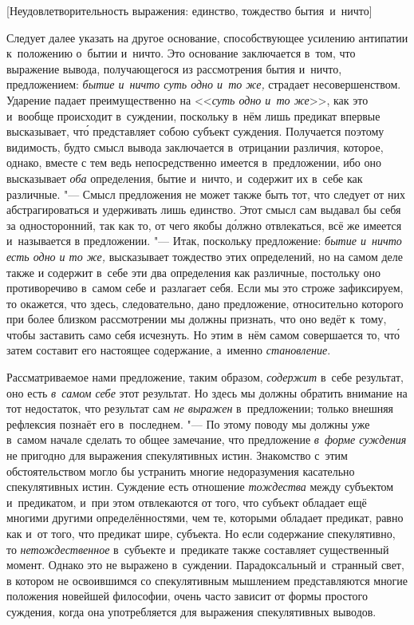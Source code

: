 %
{[Неудовлетворительность выражения: единство, тождество бытия~и~ничто]}

Следует далее указать на другое основание, способствующее усилению антипатии
к~положению о~бытии и~ничто. Это основание заключается в~том, что выражение
вывода, получающегося из рассмотрения бытия и~ничто, предложением:
{\em бытие и~ничто суть одно и~то же,} страдает несовершенством. Ударение
падает преимущественно на <<{\em суть одно и~то же}>>, как это и~вообще
происходит в~суждении, поскольку в~нём лишь предикат впервые высказывает,
чт\'{о} представляет собою субъект суждения. Получается поэтому видимость,
будто смысл вывода заключается в~отрицании различия, которое, однако, вместе с
тем ведь непосредственно имеется в~предложении, ибо оно высказывает {\em оба}
определения, бытие и~ничто, и~содержит их в~себе как различные. "--- Смысл
предложения не может также быть тот, что следует от них абстрагироваться и
удерживать лишь единство. Этот смысл сам выдавал бы себя за односторонний, так
как то, от чего якобы д\'{о}лжно отвлекаться, всё же имеется и~называется в
предложении. "--- Итак, поскольку предложение: {\em бытие и~ничто есть одно и
то же,} высказывает тождество этих определений, но на самом деле также и
содержит в~себе эти два определения как различные, постольку оно противоречиво
в~самом себе и~разлагает себя. Если мы это строже зафиксируем, то окажется, что
здесь, следовательно, дано предложение, относительно которого при более близком
рассмотрении мы должны признать, что оно ведёт к~тому, чтобы заставить само
себя исчезнуть. Но этим в~нём самом совершается то, чт\'{о} затем составит его
настоящее содержание, а~именно {\em становление}.

Рассматриваемое нами предложение, таким образом, {\em содержит} в~себе
результат, оно есть {\em в~самом себе} этот результат. Но здесь мы должны
обратить внимание на тот недостаток, что результат сам {\em не выражен}
в~предложении; только внешняя рефлексия познаёт его в~последнем. "--- По этому
поводу мы должны уже в~самом начале сделать то общее замечание, что предложение
{\em в~форме суждения} не пригодно для выражения спекулятивных истин.
Знакомство с~этим обстоятельством могло бы устранить многие недоразумения
касательно спекулятивных истин. Суждение есть отношение {\em тождества} между
субъектом и~предикатом, и~при этом отвлекаются от того, что субъект обладает
ещё многими другими определённостями, чем те, которыми обладает предикат, равно
как и~от того, что предикат шире, субъекта. Но если содержание спекулятивно, то
{\em нетождественное} в~субъекте и~предикате также составляет существенный
момент. Однако это не выражено в~суждении. Парадоксальный и~странный свет, в
котором не освоившимся со спекулятивным мышлением представляются многие
положения новейшей философии, очень часто зависит от формы простого суждения,
когда она употребляется для выражения спекулятивных выводов.

